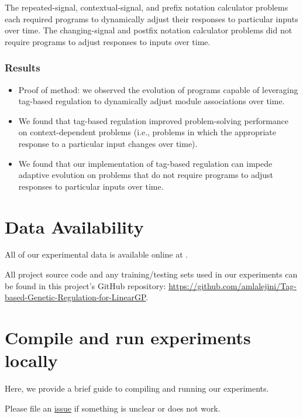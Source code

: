 \documentclass[
]{book}
\providecommand{\tightlist}{%
  \setlength{\itemsep}{0pt}\setlength{\parskip}{0pt}}
\begin{document}
The repeated-signal, contextual-signal, and prefix notation calculator problems each required programs to dynamically adjust their responses to particular inputs over time.
The changing-signal and postfix notation calculator problems did not require programs to adjust responses to inputs over time.

\hypertarget{results}{%
\subsection{Results}\label{results}}

\begin{itemize}
\tightlist
\item
  Proof of method: we observed the evolution of programs capable of leveraging tag-based regulation to dynamically adjust module associations over time.
\item
  We found that tag-based regulation improved problem-solving performance on context-dependent problems (i.e., problems in which the appropriate response to a particular input changes over time).
\item
  We found that our implementation of tag-based regulation can impede adaptive evolution on problems that do not require programs to adjust responses to particular inputs over time.
\end{itemize}

\hypertarget{data-availability}{%
\chapter{Data Availability}\label{data-availability}}

All of our experimental data is available online at \citep{Lalejini_Moreno_Ofria_Data_2020}.

All project source code and any training/testing sets used in our experiments can be found in this project's GitHub repository: \url{https://github.com/amlalejini/Tag-based-Genetic-Regulation-for-LinearGP}.

\hypertarget{compile-and-run-experiments-locally}{%
\chapter{Compile and run experiments locally}\label{compile-and-run-experiments-locally}}

Here, we provide a brief guide to compiling and running our experiments.

Please file an \href{https://github.com/amlalejini/Tag-based-Genetic-Regulation-for-LinearGP/issues}{issue} if something is unclear or does not work.
\end{document}
